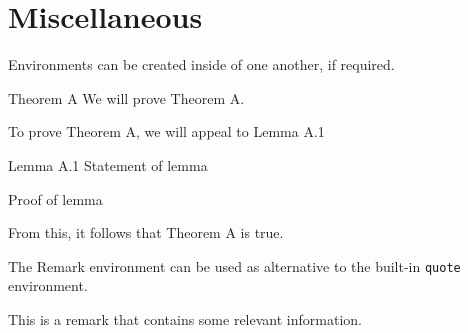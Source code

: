 \documentclass[a4paper,12pt]{article}
\begin{document}
\section{Miscellaneous}
Environments can be created inside of one another, if required.
\begin{theorem}{Theorem A}{}
    We will prove Theorem A. 
\end{theorem}
\begin{tproof*}
    To prove Theorem A, we will appeal to Lemma A.1
    \begin{lemma}{Lemma A.1}{}
        Statement of lemma
    \end{lemma}
    \begin{lproof*}{}{}
        Proof of lemma
    \end{lproof*}
    From this, it follows that Theorem A is true.
\end{tproof*}

\bigskip

The Remark environment can be used as alternative to the built-in \verb|quote| environment.
\begin{remark}{}{}
    This is a remark that contains some relevant information.
\end{remark}
\end{document}
